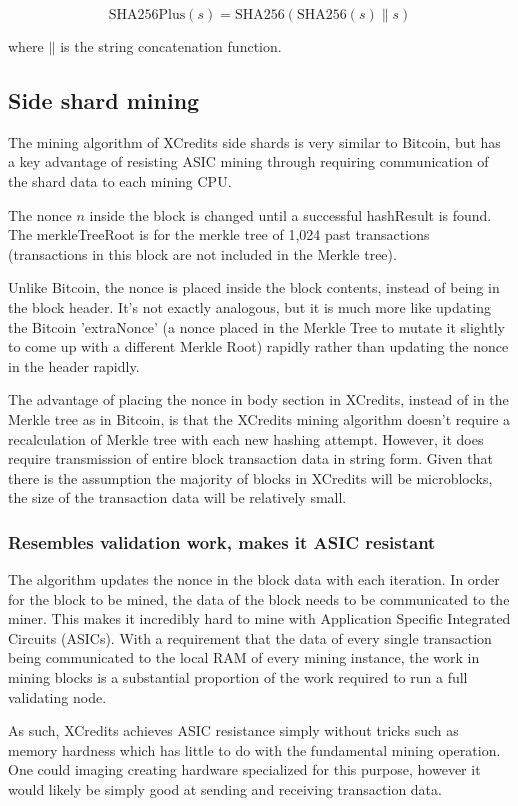\documentclass[a4paper,12pt]{article}
\newcommand{\concatenate}{\mathbin{\|}}
\begin{document}
\[ \text{SHA256Plus}(s) = \text{SHA256}(\text{SHA256}(s) \concatenate s)\]
 
where $\concatenate$ is the string concatenation function. 
  


\subsection{Side shard mining}
The mining algorithm of XCredits side shards is very similar to Bitcoin, but has a key advantage of resisting ASIC mining through requiring communication of the shard data to each mining CPU. 

The nonce $n$ inside the block is changed until a successful hashResult is found. The merkleTreeRoot is for the merkle tree of 1,024 past transactions (transactions in this block are not included in the Merkle tree).

Unlike Bitcoin, the nonce is placed inside the block contents, instead of being in the block header. It's not exactly analogous, but it is much more like updating the Bitcoin 'extraNonce' (a nonce placed in the Merkle Tree to mutate it slightly to come up with a different Merkle Root) rapidly rather than updating the nonce in the header rapidly.

The advantage of placing the nonce in body section in XCredits, instead of in the Merkle tree as in Bitcoin, is that the XCredits mining algorithm doesn't require a recalculation of Merkle tree with each new hashing attempt. However, it does require transmission of entire block transaction data in string form. Given that there is the assumption the majority of blocks in XCredits will be microblocks, the size of the transaction data will be relatively small.


\subsubsection{Resembles validation work, makes it ASIC resistant}
The algorithm updates the nonce in the block data with each iteration. In order for the block to be mined, the data of the block needs to be communicated to the miner. This makes it incredibly hard to mine with Application Specific Integrated Circuits (ASICs).  With a requirement that the data of every single transaction being communicated to the local RAM of every mining instance, the work in mining blocks is a substantial proportion of the work required to run a full validating node.

As such, XCredits achieves ASIC resistance simply without tricks such as memory hardness which has little to do with the fundamental mining operation. One could imaging creating hardware specialized for this purpose, however it would likely be simply good at sending and receiving transaction data.
\end{document}
